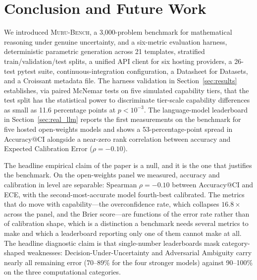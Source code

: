 \documentclass{article}
\newcommand{\muru}{\textsc{Muru-Bench}}
\begin{document}
\section{Conclusion and Future Work}
\label{sec:conclusion}

We introduced \muru{}, a 3{,}000-problem benchmark for mathematical reasoning under genuine uncertainty, and a six-metric evaluation harness, deterministic parametric generation across 21 templates, stratified train/validation/test splits, a unified API client for six hosting providers, a 26-test pytest suite, continuous-integration configuration, a Datasheet for Datasets, and a Croissant metadata file. The harness validation in Section~\ref{sec:results} establishes, via paired McNemar tests on five simulated capability tiers, that the test split has the statistical power to discriminate tier-scale capability differences as small as 11.6 percentage points at $p < 10^{-3}$. The language-model leaderboard in Section~\ref{sec:real_llm} reports the first measurements on the benchmark for five hosted open-weights models and shows a 53-percentage-point spread in Accuracy@CI alongside a near-zero rank correlation between accuracy and Expected Calibration Error ($\rho = -0.10$).

The headline empirical claim of the paper is a null, and it is the one that justifies the benchmark. On the open-weights panel we measured, accuracy and calibration in level are separable: Spearman $\rho = -0.10$ between Accuracy@CI and ECE, with the second-most-accurate model fourth-best calibrated. The metrics that do move with capability---the overconfidence rate, which collapses $16.8\times$ across the panel, and the Brier score---are functions of the error rate rather than of calibration shape, which is a distinction a benchmark needs several metrics to make and which a leaderboard reporting only one of them cannot make at all. The headline diagnostic claim is that single-number leaderboards mask category-shaped weaknesses: Decision-Under-Uncertainty and Adversarial Ambiguity carry nearly all remaining error (70--89\% for the four stronger models) against 90--100\% on the three computational categories.
\end{document}

